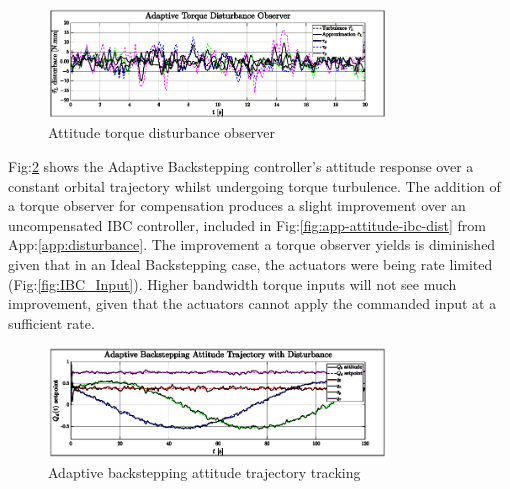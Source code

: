 \begin{figure}[htbp]
\vspace{-10pt}
\centering
\includegraphics[width=0.8\textwidth]{graphs/torque-observer}
\vspace{-10pt}
\caption{Attitude torque disturbance observer}
\vspace{-18pt}
\label{fig:torque-observer}
\end{figure}
\par
Fig:\ref{fig:ABC_trajectory} shows the Adaptive Backstepping controller's attitude response over a constant orbital trajectory whilst undergoing torque turbulence. The addition of a torque observer for compensation produces a slight improvement over an uncompensated IBC controller, included in Fig:\ref{fig:app-attitude-ibc-dist} from App:\ref{app:disturbance}. The improvement a torque observer yields is diminished given that in an Ideal Backstepping case, the actuators were being rate limited (Fig:\ref{fig:IBC_Input}). Higher bandwidth torque inputs will not see much improvement, given that the actuators cannot apply the commanded input at a sufficient rate.
\begin{figure}[hbtp]
\vspace{-6pt}
\centering
\includegraphics[width=0.8\textwidth]{graphs/ABC_trajectory}
\vspace{-10pt}
\caption{Adaptive backstepping attitude trajectory tracking}
\label{fig:ABC_trajectory}
\vspace{-16pt}
\end{figure}
